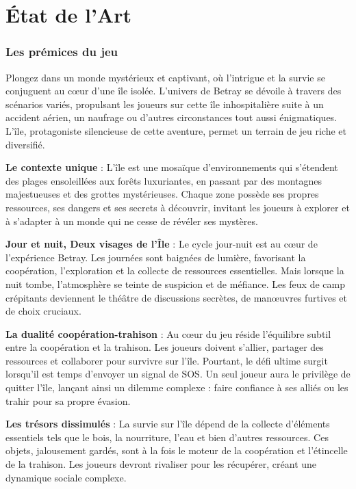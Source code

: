 \documentclass[
	article,			%
	11pt,				%
	oneside,			%
	a4paper,			%
	chapter=TITLE,
	french,			%
	sumario=tradicional
	]{base_nt}
\begin{document}
\part{État de l'Art}

\section{Les prémices du jeu}

Plongez dans un monde mystérieux et captivant, où l'intrigue et la survie se conjuguent au cœur d'une île isolée. L'univers de Betray se dévoile à travers des scénarios variés, propulsant les joueurs sur cette île inhospitalière suite à un accident aérien, un naufrage ou d'autres circonstances tout aussi énigmatiques. L'île, protagoniste silencieuse de cette aventure, permet un terrain de jeu riche et diversifié.

\textbf{Le contexte unique} : L'île est une mosaïque d'environnements qui s'étendent des plages ensoleillées aux forêts luxuriantes, en passant par des montagnes majestueuses et des grottes mystérieuses. Chaque zone possède ses propres ressources, ses dangers et ses secrets à découvrir, invitant les joueurs à explorer et à s'adapter à un monde qui ne cesse de révéler ses mystères.

\textbf{Jour et nuit, Deux visages de l'Île} : Le cycle jour-nuit est au cœur de l'expérience Betray. Les journées sont baignées de lumière, favorisant la coopération, l'exploration et la collecte de ressources essentielles. Mais lorsque la nuit tombe, l'atmosphère se teinte de suspicion et de méfiance. Les feux de camp crépitants deviennent le théâtre de discussions secrètes, de manœuvres furtives et de choix cruciaux.

\textbf{La dualité coopération-trahison} : Au cœur du jeu réside l'équilibre subtil entre la coopération et la trahison. Les joueurs doivent s'allier, partager des ressources et collaborer pour survivre sur l'île. Pourtant, le défi ultime surgit lorsqu'il est temps d'envoyer un signal de SOS. Un seul joueur aura le privilège de quitter l'île, lançant ainsi un dilemme complexe : faire confiance à ses alliés ou les trahir pour sa propre évasion.

\textbf{Les trésors dissimulés} : La survie sur l'île dépend de la collecte d'éléments essentiels tels que le bois, la nourriture, l'eau et bien d'autres ressources. Ces objets, jalousement gardés, sont à la fois le moteur de la coopération et l'étincelle de la trahison. Les joueurs devront rivaliser pour les récupérer, créant une dynamique sociale complexe.
\end{document}
